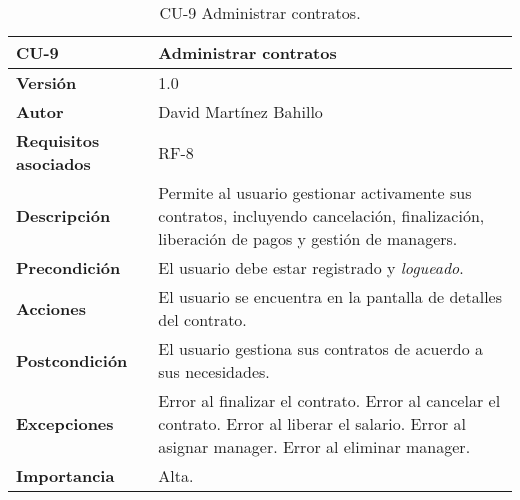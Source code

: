 \begin{table}[p]
	\centering
	\begin{tabularx}{\linewidth}{ p{} p{} }
		\toprule
		\textbf{CU-9}    & \textbf{Administrar contratos}\\
		\midrule
		\textbf{Versión}              & 1.0    \\
		\textbf{Autor}                & David Martínez Bahillo \\
		\textbf{Requisitos asociados} & RF-8 \\
		\textbf{Descripción}          & Permite al usuario gestionar activamente sus contratos, incluyendo cancelación, finalización, liberación de pagos y gestión de managers. \\
		\textbf{Precondición}         & El usuario debe estar registrado y \textit{logueado}. \\
		\textbf{Acciones}             & El usuario se encuentra en la pantalla de detalles del contrato. \\
		\textbf{Postcondición}        & El usuario gestiona sus contratos de acuerdo a sus necesidades. \\
		\textbf{Excepciones}          & Error al finalizar el contrato. Error al cancelar el contrato. Error al
		 liberar el salario. Error al asignar manager. Error al eliminar manager. \\
		\textbf{Importancia}          & Alta. \\
		\bottomrule
	\end{tabularx}
	\caption{CU-9 Administrar contratos.}
\end{table}


